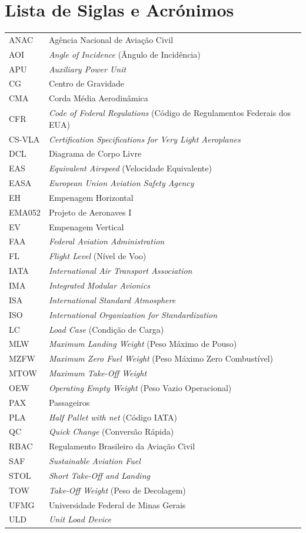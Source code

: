 \section*{Lista de Siglas e Acrónimos}
\begin{longtable}{p{} p{}}
ANAC & Agência Nacional de Aviação Civil \\
AOI & \textit{Angle of Incidence} (Ângulo de Incidência) \\
APU & \textit{Auxiliary Power Unit} \\
CG & Centro de Gravidade \\
CMA & Corda Média Aerodinâmica \\
CFR & \textit{Code of Federal Regulations} (Código de Regulamentos Federais dos EUA) \\
CS-VLA & \textit{Certification Specifications for Very Light Aeroplanes} \\
DCL & Diagrama de Corpo Livre \\
EAS & \textit{Equivalent Airspeed} (Velocidade Equivalente) \\
EASA & \textit{European Union Aviation Safety Agency} \\
EH & Empenagem Horizontal \\
EMA052 & Projeto de Aeronaves I \\
EV & Empenagem Vertical \\
FAA & \textit{Federal Aviation Administration} \\
FL & \textit{Flight Level} (Nível de Voo) \\
IATA & \textit{International Air Transport Association} \\
IMA & \textit{Integrated Modular Avionics} \\
ISA & \textit{International Standard Atmosphere} \\
ISO & \textit{International Organization for Standardization} \\
LC & \textit{Load Case} (Condição de Carga) \\
MLW & \textit{Maximum Landing Weight} (Peso Máximo de Pouso) \\
MZFW & \textit{Maximum Zero Fuel Weight} (Peso Máximo Zero Combustível) \\
MTOW & \textit{Maximum Take-Off Weight} \\
OEW & \textit{Operating Empty Weight} (Peso Vazio Operacional) \\
PAX & Passageiros \\
PLA & \textit{Half Pallet with net} (Código IATA) \\
QC & \textit{Quick Change} (Conversão Rápida) \\
RBAC & Regulamento Brasileiro da Aviação Civil \\
SAF & \textit{Sustainable Aviation Fuel} \\
STOL & \textit{Short Take-Off and Landing} \\
TOW & \textit{Take-Off Weight} (Peso de Decolagem) \\
UFMG & Universidade Federal de Minas Gerais \\
ULD & \textit{Unit Load Device} \\
\hline
\end{longtable}